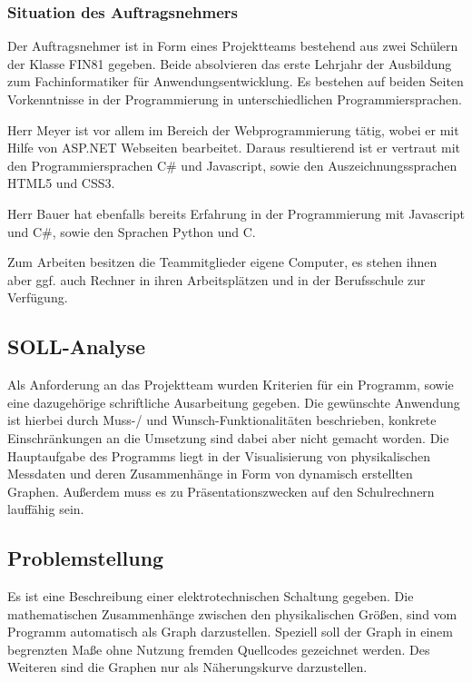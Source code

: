 \documentclass[a4paper]{article}
\begin{document}
\subsubsection{Situation des Auftragsnehmers}

    Der Auftragsnehmer ist in Form eines Projektteams bestehend aus zwei Schülern der Klasse FIN81 gegeben.
    Beide absolvieren das erste Lehrjahr der Ausbildung zum Fachinformatiker für Anwendungsentwicklung.
    Es bestehen auf beiden Seiten Vorkenntnisse in der Programmierung in unterschiedlichen Programmiersprachen.

    Herr Meyer ist vor allem im Bereich der Webprogrammierung tätig, wobei er mit Hilfe von \glqq ASP.NET\grqq{} Webseiten bearbeitet.
    Daraus resultierend ist er vertraut mit den Programmiersprachen \glqq C\#\grqq{} und \glqq Javascript\grqq{}, sowie den Auszeichnungssprachen \glqq HTML5\grqq{} und \glqq CSS3\grqq{}.

    Herr Bauer hat ebenfalls bereits Erfahrung in der Programmierung mit \glqq Javascript\grqq{} und \glqq C\#\grqq{}, sowie den Sprachen \glqq Python\grqq{} und \glqq C\grqq{}.

    Zum Arbeiten besitzen die Teammitglieder eigene Computer, es stehen ihnen aber ggf. auch Rechner in ihren Arbeitsplätzen und in der Berufsschule zur Verfügung.

\subsection{SOLL-Analyse}

    Als Anforderung an das Projektteam wurden Kriterien für ein Programm, sowie eine dazugehörige schriftliche Ausarbeitung gegeben.
    Die gewünschte Anwendung ist hierbei durch Muss-/ und Wunsch-Funktionalitäten beschrieben, konkrete Einschränkungen an die Umsetzung sind dabei aber nicht gemacht worden.
    Die Hauptaufgabe des Programms liegt in der Visualisierung von physikalischen Messdaten und deren Zusammenhänge in Form von dynamisch erstellten Graphen.
    Außerdem muss es zu Präsentationszwecken auf den Schulrechnern lauffähig sein.

\subsection{Problemstellung}

    Es ist eine Beschreibung einer elektrotechnischen Schaltung gegeben. Die mathematischen Zusammenhänge zwischen den physikalischen Größen, sind vom Programm automatisch als Graph darzustellen. Speziell soll der Graph in einem begrenzten Maße ohne Nutzung fremden Quellcodes gezeichnet werden. Des Weiteren sind die Graphen nur als Näherungskurve darzustellen.
\end{document}
